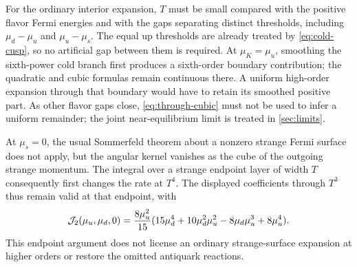 For the ordinary interior expansion, \(T\) must be small compared with the positive flavor Fermi energies and with the gaps separating distinct thresholds, including \(\mu_d-\mu_u\) and \(\mu_u-\mu_s\).
The equal up thresholds are already treated by \cref{eq:cold-cusp}, so no artificial gap between them is required.
At \(\mu_K=\mu_u\), smoothing the sixth-power cold branch first produces a sixth-order boundary contribution; the quadratic and cubic formulas remain continuous there.
A uniform high-order expansion through that boundary would have to retain its smoothed positive part.
As other flavor gaps close, \cref{eq:through-cubic} must not be used to infer a uniform remainder; the joint near-equilibrium limit is treated in \cref{sec:limits}.

At \(\mu_s=0\), the usual Sommerfeld theorem about a nonzero strange Fermi surface does not apply, but the angular kernel vanishes as the cube of the outgoing strange momentum.
The integral over a strange endpoint layer of width \(T\) consequently first changes the rate at \(T^4\).
The displayed coefficients through \(T^3\) thus remain valid at that endpoint, with
\begin{equation}
 \mathcal J_2(\mu_u,\mu_d,0)=\frac{8\mu_u^2}{15}
 (15\mu_d^4+10\mu_d^2\mu_u^2-8\mu_d\mu_u^3+8\mu_u^4).
 \label{eq:thermal-strange-zero}
\end{equation}
This endpoint argument does not license an ordinary strange-surface expansion at higher orders or restore the omitted antiquark reactions.
